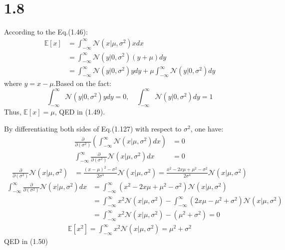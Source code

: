 \documentclass[10pt,a4paper,draft]{book}
\begin{document}
\section*{1.8}
According to the Eq.(1.46):
\begin{equation}
\begin{aligned}
\mathbb{E}[x] &= \int_{-\infty}^{\infty}\mathcal{N}(x|\mu,\sigma^2)x dx \\
&= \int_{-\infty}^{\infty}\mathcal{N}(y|0,\sigma^2)(y + \mu) dy \\
&= \int_{-\infty}^{\infty}\mathcal{N}(y|0,\sigma^2)ydy + \mu\int_{-\infty}^{\infty}\mathcal{N}(y|0,\sigma^2)dy
\end{aligned}
\end{equation}
where $y = x-\mu$.Based on the fact:
\begin{equation}
\int_{-\infty}^{\infty}\mathcal{N}(y|0,\sigma^2)ydy = 0, \quad \int_{-\infty}^{\infty}\mathcal{N}(y|0,\sigma^2)dy = 1
\end{equation}
Thus, $\mathbb{E}[x] = \mu$, QED in (1.49).

By differentiating both sides of Eq.(1.127) with respect to $\sigma^2$, one have:
\begin{equation}
\begin{aligned}
\frac{\partial}{\partial (\sigma^2)} \left(\int_{-\infty}^{\infty}\mathcal{N}(x|\mu,\sigma^2) dx\right) &= 0 \\
\int_{-\infty}^{\infty} \frac{\partial}{\partial (\sigma^2)} \mathcal{N}(x|\mu,\sigma^2) dx &= 0
\end{aligned}
\end{equation}
\begin{equation}
\begin{aligned}
\frac{\partial}{\partial (\sigma^2)} \mathcal{N}(x|\mu,\sigma^2) &= \frac{(x-\mu)^2 - \sigma^2}{2\sigma^4} \mathcal{N}(x|\mu,\sigma^2) = 
\frac{x^2 - 2x\mu+\mu^2 - \sigma^2}{2\sigma^4} \mathcal{N}(x|\mu,\sigma^2)
\end{aligned}
\end{equation}
\begin{equation}
\begin{aligned}
\int_{-\infty}^{\infty} \frac{\partial}{\partial (\sigma^2)} \mathcal{N}(x|\mu,\sigma^2) dx &= \int_{-\infty}^{\infty}(x^2 - 2x\mu+\mu^2 - \sigma^2)\mathcal{N}(x|\mu,\sigma^2) \\
& = \int_{-\infty}^{\infty}x^2\mathcal{N}(x|\mu,\sigma^2) - \int_{-\infty}^{\infty}(2x\mu-\mu^2+\sigma^2)\mathcal{N}(x|\mu,\sigma^2) \\
&= \int_{-\infty}^{\infty}x^2\mathcal{N}(x|\mu,\sigma^2) - (\mu^2+\sigma^2) = 0
\end{aligned}
\end{equation}
\begin{equation}
\begin{aligned}
\mathbb{E}[x^2] = \int_{-\infty}^{\infty}x^2\mathcal{N}(x|\mu,\sigma^2) = \mu^2+\sigma^2
\end{aligned}
\end{equation}
QED in (1.50)
\end{document}
